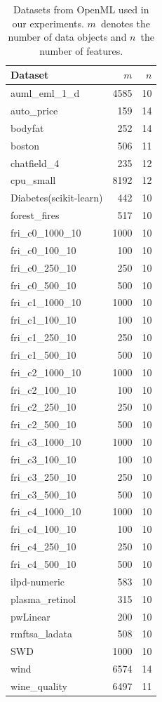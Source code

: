 \begin{table}[t]
	\centering
	\caption{
		Datasets from OpenML used in our experiments.
		$m$~denotes the number of data objects and $n$~the number of features.
	}
	\begin{tabular}{lrr}
		\toprule
		Dataset & $m$ & $n$ \\
		\midrule
		auml\_eml\_1\_d &  4585 &  10 \\
		auto\_price &   159 &  14 \\
		bodyfat &   252 &  14 \\
		boston &   506 &  11 \\
		chatfield\_4 &   235 &  12 \\
		cpu\_small &  8192 &  12 \\
		Diabetes(scikit-learn) &   442 &  10 \\
		forest\_fires &   517 &  10 \\
		fri\_c0\_1000\_10 &  1000 &  10 \\
		fri\_c0\_100\_10 &   100 &  10 \\
		fri\_c0\_250\_10 &   250 &  10 \\
		fri\_c0\_500\_10 &   500 &  10 \\
		fri\_c1\_1000\_10 &  1000 &  10 \\
		fri\_c1\_100\_10 &   100 &  10 \\
		fri\_c1\_250\_10 &   250 &  10 \\
		fri\_c1\_500\_10 &   500 &  10 \\
		fri\_c2\_1000\_10 &  1000 &  10 \\
		fri\_c2\_100\_10 &   100 &  10 \\
		fri\_c2\_250\_10 &   250 &  10 \\
		fri\_c2\_500\_10 &   500 &  10 \\
		fri\_c3\_1000\_10 &  1000 &  10 \\
		fri\_c3\_100\_10 &   100 &  10 \\
		fri\_c3\_250\_10 &   250 &  10 \\
		fri\_c3\_500\_10 &   500 &  10 \\
		fri\_c4\_1000\_10 &  1000 &  10 \\
		fri\_c4\_100\_10 &   100 &  10 \\
		fri\_c4\_250\_10 &   250 &  10 \\
		fri\_c4\_500\_10 &   500 &  10 \\
		ilpd-numeric &   583 &  10 \\
		plasma\_retinol &   315 &  10 \\
		pwLinear &   200 &  10 \\
		rmftsa\_ladata &   508 &  10 \\
		SWD &  1000 &  10 \\
		wind &  6574 &  14 \\
		wine\_quality &  6497 &  11 \\
		\bottomrule
	\end{tabular}
	\label{tab:syn:datasets}
\end{table}

